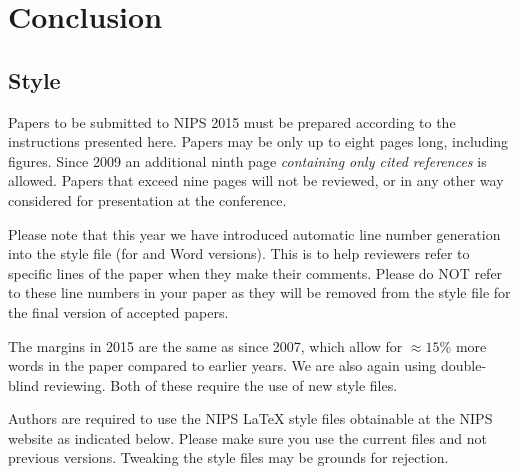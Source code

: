 \documentclass{article} %
\begin{document}
\section{Conclusion}


























\subsection{Style}

Papers to be submitted to NIPS 2015 must be prepared according to the
instructions presented here. Papers may be only up to eight pages long,
including figures. Since 2009 an additional ninth page \textit{containing only
cited references} is allowed. Papers that exceed nine pages will not be
reviewed, or in any other way considered for presentation at the conference.

Please note that this year we have introduced automatic line number generation
into the style file (for \LaTeXe and Word versions). This is to help reviewers
refer to specific lines of the paper when they make their comments. Please do
NOT refer to these line numbers in your paper as they will be removed from the
style file for the final version of accepted papers.

The margins in 2015 are the same as since 2007, which allow for $\approx 15\%$
more words in the paper compared to earlier years. We are also again using 
double-blind reviewing. Both of these require the use of new style files.

Authors are required to use the NIPS \LaTeX{} style files obtainable at the
NIPS website as indicated below. Please make sure you use the current files and
not previous versions. Tweaking the style files may be grounds for rejection.


\end{document}
